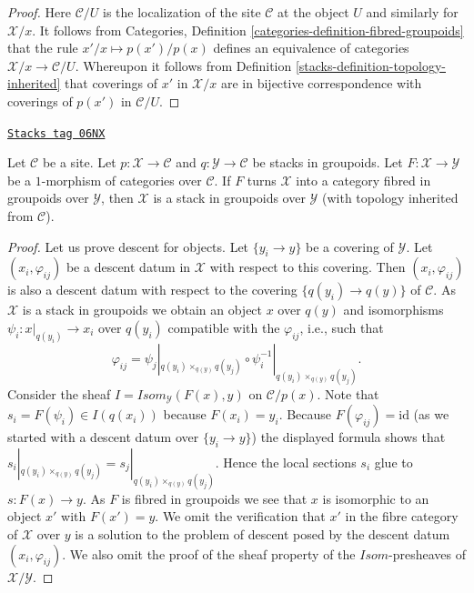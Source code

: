 \begin{proof}

Here $\mathcal{C}/U$ is the localization of the site
$\mathcal{C}$ at the object $U$ and similarly for $\mathcal{X}/x$.
It follows from
Categories, Definition \ref{categories-definition-fibred-groupoids}
that the rule $x'/x \mapsto p(x')/p(x)$ defines an equivalence of
categories $\mathcal{X}/x \to \mathcal{C}/U$. Whereupon it follows from
Definition \ref{stacks-definition-topology-inherited}
that coverings of $x'$ in $\mathcal{X}/x$ are in bijective correspondence
with coverings of $p(x')$ in $\mathcal{C}/U$.
\end{proof}

\begin{lemma}
\label{stacks-lemma-stack-in-groupoids-over-stack-in-groupoids}
\href{https://stacks.math.columbia.edu/tag/06NX}{\texttt{Stacks tag 06NX}}

Let $\mathcal{C}$ be a site. Let $p : \mathcal{X} \to \mathcal{C}$
and $q : \mathcal{Y} \to \mathcal{C}$
be stacks in groupoids. Let $F : \mathcal{X} \to \mathcal{Y}$
be a $1$-morphism of categories over $\mathcal{C}$. If $F$ turns
$\mathcal{X}$ into a category fibred in groupoids over $\mathcal{Y}$,
then $\mathcal{X}$ is a stack in groupoids over $\mathcal{Y}$ (with
topology inherited from $\mathcal{C}$).
\end{lemma}

\begin{proof}
Let us prove descent for objects. Let $\{y_i \to y\}$ be a covering
of $\mathcal{Y}$. Let $(x_i, \varphi_{ij})$ be a descent datum in $\mathcal{X}$
with respect to this covering. Then $(x_i, \varphi_{ij})$ is also a descent
datum with respect to the covering $\{q(y_i) \to q(y)\}$ of
$\mathcal{C}$. As $\mathcal{X}$ is a stack in groupoids we obtain an
object $x$ over $q(y)$ and isomorphisms $\psi_i : x|_{q(y_i)} \to x_i$
over $q(y_i)$ compatible with the $\varphi_{ij}$, i.e., such that
$$
\varphi_{ij} = \psi_j|_{q(y_i) \times_{q(y)} q(y_j)}
\circ \psi_i^{-1}|_{q(y_i) \times_{q(y)} q(y_j)}.
$$
Consider the sheaf $\mathit{I} = \mathit{Isom}_\mathcal{Y}(F(x), y)$
on $\mathcal{C}/p(x)$. Note that $s_i = F(\psi_i) \in \mathit{I}(q(x_i))$
because $F(x_i) = y_i$. Because $F(\varphi_{ij}) = \text{id}$ (as we started
with a descent datum over $\{y_i \to y\}$) the displayed formula shows
that $s_i|_{q(y_i) \times_{q(y)} q(y_j)} = s_j|_{q(y_i) \times_{q(y)} q(y_j)}$.
Hence the local sections $s_i$ glue to $s : F(x) \to y$. As $F$ is fibred in
groupoids we see that $x$ is isomorphic to an object $x'$ with $F(x') = y$.
We omit the verification that $x'$ in the fibre category of $\mathcal{X}$
over $y$ is a solution to the problem of descent posed by the descent datum
$(x_i, \varphi_{ij})$. We also omit the proof of the sheaf property
of the $\mathit{Isom}$-presheaves of $\mathcal{X}/\mathcal{Y}$.
\end{proof}

